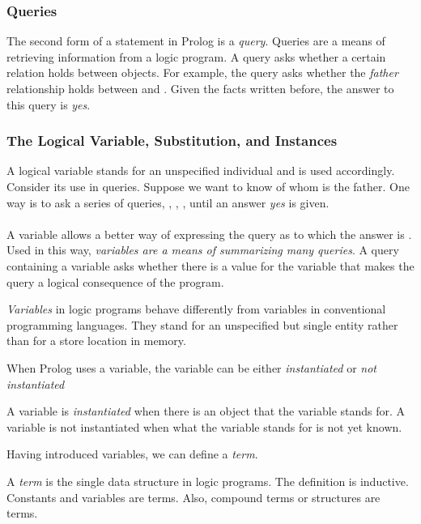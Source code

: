 \subsubsection{Queries}
The second form of a statement in Prolog is a \textit{query}. Queries are a means of retrieving information from a logic program. A query asks whether a certain relation holds between objects. For example, the query  asks whether the \textit{father} relationship holds between  and . Given the facts written before, the answer to this query is \textit{yes}.
\subsubsection{The Logical Variable, Substitution, and Instances}
A logical variable stands for an unspecified individual and is used accordingly. Consider its use in queries. Suppose we want to know of whom  is the father. One way is to ask a series of queries, , , , until an answer \textit{yes} is given.\\\\
A variable allows a better way of expressing the query as  to which the answer is . Used in this way, \textit{variables are a means of summarizing many queries}. A query containing a variable asks whether there is a value for the variable that makes the query a logical consequence of the program.\\
\begin{definition*}[Variable]
	\textit{Variables} in logic programs behave differently from variables in conventional programming languages. They stand for an unspecified but single entity rather than for a store location in memory.
\end{definition*}
When Prolog uses a variable, the variable can be either \textit{instantiated} or \textit{not instantiated}\\
\begin{definition*}[Instantiation]
	A variable is \textit{instantiated} when there is an object that the variable stands for. A variable is not instantiated when what the variable stands for is not yet known.
\end{definition*}
Having introduced variables, we can define a \textit{term}.\\
\begin{definition*}[Term]
	A \textit{term} is the single data structure in logic programs. The definition is inductive. Constants and variables are terms. Also, compound terms or structures are terms.
\end{definition*}
